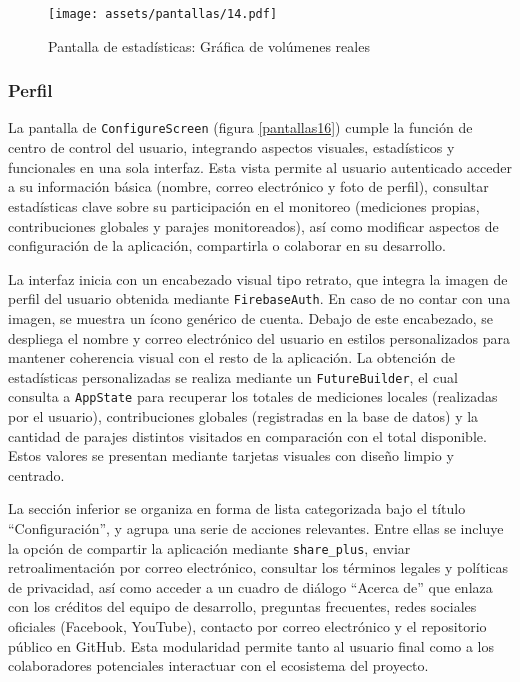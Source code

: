 \begin{figure}[h!]
\centering
  \texttt{[image: assets/pantallas/14.pdf]}
  \caption{Pantalla de estadísticas: Gráfica de volúmenes reales }
  \label{pantallas14}
\end{figure}

\newpage
\subsubsection*{Perfil} 

La pantalla de \texttt{ConfigureScreen} (figura \ref{pantallas16}) cumple la función de centro de control del usuario, integrando aspectos visuales, estadísticos y funcionales en una sola interfaz. Esta vista permite al usuario autenticado acceder a su información básica (nombre, correo electrónico y foto de perfil), consultar estadísticas clave sobre su participación en el monitoreo (mediciones propias, contribuciones globales y parajes monitoreados), así como modificar aspectos de configuración de la aplicación, compartirla o colaborar en su desarrollo.

La interfaz inicia con un encabezado visual tipo retrato, que integra la imagen de perfil del usuario obtenida mediante \texttt{FirebaseAuth}. En caso de no contar con una imagen, se muestra un ícono genérico de cuenta. Debajo de este encabezado, se despliega el nombre y correo electrónico del usuario en estilos personalizados para mantener coherencia visual con el resto de la aplicación. La obtención de estadísticas personalizadas se realiza mediante un \texttt{FutureBuilder}, el cual consulta a \texttt{AppState} para recuperar los totales de mediciones locales (realizadas por el usuario), contribuciones globales (registradas en la base de datos) y la cantidad de parajes distintos visitados en comparación con el total disponible. Estos valores se presentan mediante tarjetas visuales con diseño limpio y centrado.

La sección inferior se organiza en forma de lista categorizada bajo el título ``Configuración'', y agrupa una serie de acciones relevantes. Entre ellas se incluye la opción de compartir la aplicación mediante \texttt{share\_plus}, enviar retroalimentación por correo electrónico, consultar los términos legales y políticas de privacidad, así como acceder a un cuadro de diálogo “Acerca de” que enlaza con los créditos del equipo de desarrollo, preguntas frecuentes, redes sociales oficiales (Facebook, YouTube), contacto por correo electrónico y el repositorio público en GitHub. Esta modularidad permite tanto al usuario final como a los colaboradores potenciales interactuar con el ecosistema del proyecto.

